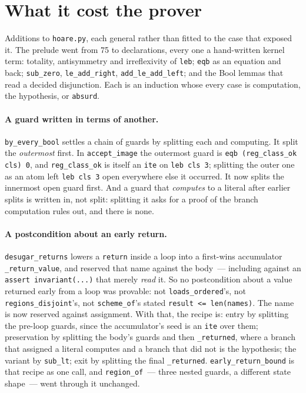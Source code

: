\documentclass[11pt]{article}
\begin{document}
\section{What it cost the prover}
\label{sec:prover}

Additions to \texttt{hoare.py}, each general rather than fitted to the
case that exposed it.  The prelude went from 75 to \preludeDecls{}
declarations, every one a hand-written kernel term: totality, antisymmetry
and irreflexivity of \texttt{leb}; \texttt{eqb} as an equation and back;
\texttt{sub\_zero}, \texttt{le\_add\_right}, \texttt{add\_le\_add\_left};
and the Bool lemmas that read a decided disjunction.  Each is an induction
whose every case is computation, the hypothesis, or \texttt{absurd}.

\paragraph{A guard written in terms of another.}
\texttt{by\_every\_bool} settles a chain of guards by splitting each and
computing.  It split the \emph{outermost} first.  In \texttt{accept\_image}
the outermost guard is \texttt{eqb (reg\_class\_ok cls) 0}, and
\texttt{reg\_class\_ok} is itself an \texttt{ite} on \texttt{leb cls 3};
splitting the outer one as an atom left \texttt{leb cls 3} open everywhere
else it occurred.  It now splits the innermost open guard first.  And a
guard that \emph{computes} to a literal after earlier splits is written in,
not split: splitting it asks for a proof of the branch computation rules
out, and there is none.

\paragraph{A postcondition about an early return.}
\texttt{desugar\_returns} lowers a \texttt{return} inside a loop into a
first-wins accumulator \texttt{\_return\_value}, and reserved that name
against the body~--- including against an
\texttt{assert invariant(...)} that merely \emph{read} it.  So no
postcondition about a value returned early from a loop was provable: not
\texttt{loads\_ordered}'s, not \texttt{regions\_disjoint}'s, not
\texttt{scheme\_of}'s stated \texttt{result <= len(names)}.  The name is
now reserved against assignment.  With that, the recipe is:
entry by splitting the pre-loop guards, since the accumulator's seed is an
\texttt{ite} over them; preservation by splitting the body's guards and
then \texttt{\_returned}, where a branch that assigned a literal computes
and a branch that did not is the hypothesis; the variant by
\texttt{sub\_lt}; exit by splitting the final \texttt{\_returned}.
\texttt{early\_return\_bound} is that recipe as one call, and
\texttt{region\_of}~--- three nested guards, a different state
shape~--- went through it unchanged.
\end{document}
